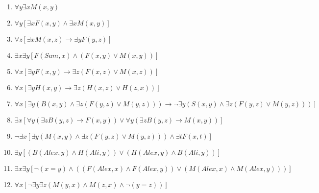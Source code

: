 \documentclass[a4paper,12pt]{article}
\begin{document}
\begin{tcolorbox}
\begin{enumerate}
    \item $\forall y \exists x M(x,y)$
    \item $\forall y \left[\exists x F(x,y) \wedge \exists x M(x,y)\right]$
    \item $\forall z \left[\exists x M(x,z) \rightarrow \exists y F(y,z)\right]$
    \item $\exists x \exists y \left[F(Sam,x) \wedge (F(x,y) \vee M(x,y))\right]$
    \item $\forall x \left[\exists y F(x,y) \rightarrow \exists z (F(x,z) \vee M(x,z))\right]$
    \item $\forall x \left[\exists y H(x,y) \rightarrow \exists z \left(H(x,z) \vee H(z,x)\right)\right]$
    \item $\forall x \left[\exists y \left(B(x,y) \wedge \exists z \left(F(y,z) \vee M(y,z)\right)\right) \rightarrow \neg \exists y \left(S(x,y) \wedge \exists z \left(F(y,z) \vee M(y,z)\right)\right)\right]$
    \item $\exists x \left[\forall y \left(\exists z B(y,z) \rightarrow F(x,y)\right) \vee \forall y \left(\exists z B(y,z) \rightarrow M(x,y)\right)\right]$
    \item $\neg \exists x \left[\exists y \left(M(x,y) \wedge \exists z \left(F(y,z) \vee M(y,z)\right)\right) \wedge \exists t F(x,t)\right]$
    \item $\exists y \left[\left(B(Alex,y) \wedge H(Ali,y)\right) \vee \left(H(Alex,y) \wedge B(Ali,y)\right)\right]$
    \item $\exists x \exists y \left[\neg (x=y) \wedge \left(\left(F(Alex,x) \wedge F(Alex,y)\right) \vee \left(M(Alex,x) \wedge M(Alex,y)\right)\right)\right]$
    \item $\forall x \left[\neg \exists y \exists z \left(M(y,x) \wedge M(z,x) \wedge \neg \left(y=z\right) \right)\right]$
\end{enumerate}
\end{tcolorbox}


\newpage
\end{document}
